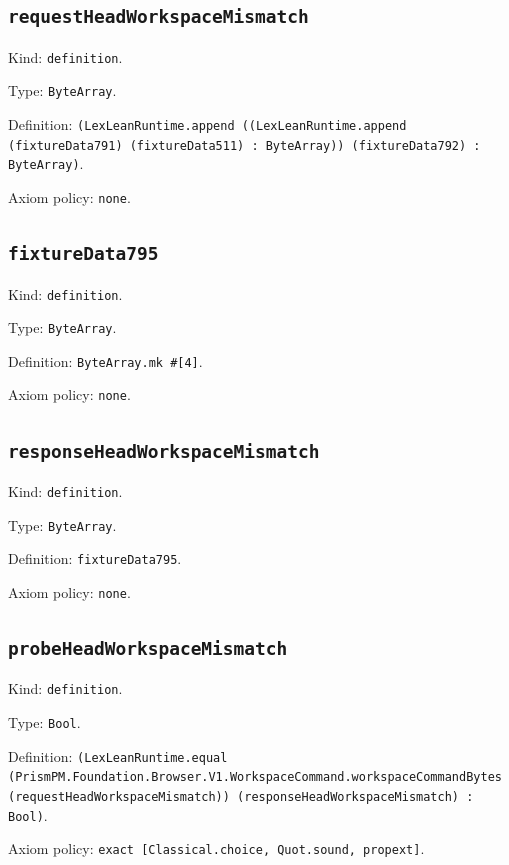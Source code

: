 \documentclass[11pt]{article}
\begin{document}
\subsection*{\texttt{requestHeadWorkspaceMismatch}}
\noindent Kind: \texttt{definition}.\par
\noindent Type: \texttt{ByteArray}.\par
\noindent Definition: \texttt{(LexLeanRuntime.append ((LexLeanRuntime.append (fixtureData791) (fixtureData511) : ByteArray)) (fixtureData792) : ByteArray)}.\par
\noindent Axiom policy: \texttt{none}.\par
\subsection*{\texttt{fixtureData795}}
\noindent Kind: \texttt{definition}.\par
\noindent Type: \texttt{ByteArray}.\par
\noindent Definition: \texttt{ByteArray.mk \#[4]}.\par
\noindent Axiom policy: \texttt{none}.\par
\subsection*{\texttt{responseHeadWorkspaceMismatch}}
\noindent Kind: \texttt{definition}.\par
\noindent Type: \texttt{ByteArray}.\par
\noindent Definition: \texttt{fixtureData795}.\par
\noindent Axiom policy: \texttt{none}.\par
\subsection*{\texttt{probeHeadWorkspaceMismatch}}
\noindent Kind: \texttt{definition}.\par
\noindent Type: \texttt{Bool}.\par
\noindent Definition: \texttt{(LexLeanRuntime.equal (PrismPM.Foundation.Browser.V1.WorkspaceCommand.workspaceCommandBytes (requestHeadWorkspaceMismatch)) (responseHeadWorkspaceMismatch) : Bool)}.\par
\noindent Axiom policy: \texttt{exact [Classical.choice, Quot.sound, propext]}.\par
\end{document}
